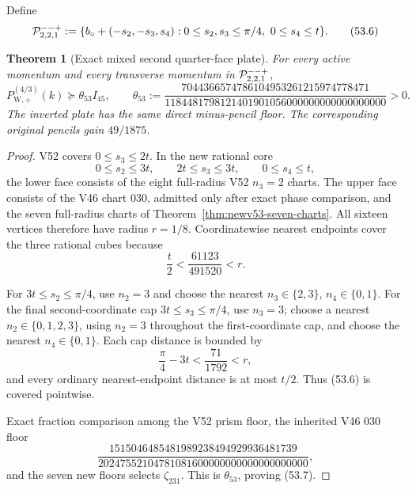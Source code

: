 \documentclass[11pt,oneside]{article}
\newtheorem{theorem}{Theorem}[section]
\theoremstyle{definition}
\theoremstyle{remark}
\begin{document}
Define
\[
 {\cal P}_{2,2,1}^{--+}:=
 \{b_\circ+(-s_2,-s_3,s_4):
 0\le s_2,s_3\le\pi/4,\ 0\le s_4\le t\}.             \tag{53.6}
\]

\begin{theorem}[Exact mixed second quarter-face plate]
\label{thm:newv53-mixed-plate}
For every active momentum and every transverse momentum in
\({\cal P}_{2,2,1}^{--+}\),
\[
 P_{\mathrm W,+}^{(4/3)}(k)
 \succeq\theta_{53}I_{45},\qquad
 \theta_{53}:=
 \frac{7044366574786104953261215974778471}
 {1184481798121401901056000000000000000000}>0.         \tag{53.7}
\]
The inverted plate has the same direct minus-pencil floor.  The
corresponding original pencils gain \(49/1875\).
\end{theorem}

\begin{proof}
V52 covers \(0\le s_3\le2t\).  In the new rational core
\[
 0\le s_2\le3t,\qquad2t\le s_3\le3t,\qquad
 0\le s_4\le t,                                      \tag{53.8}
\]
the lower face consists of the eight full-radius V52 \(n_3=2\)
charts.  The upper face consists of the V46 chart \(030\), admitted
only after exact phase comparison, and the seven full-radius charts
of Theorem~\ref{thm:newv53-seven-charts}.  All sixteen vertices
therefore have radius \(r=1/8\).  Coordinatewise nearest endpoints
cover the three rational cubes because
\[
 \frac t2<\frac{61123}{491520}<r.                    \tag{53.9}
\]

For \(3t\le s_2\le\pi/4\), use \(n_2=3\) and choose the nearest
\(n_3\in\{2,3\}\), \(n_4\in\{0,1\}\).  For the final
second-coordinate cap \(3t\le s_3\le\pi/4\), use \(n_3=3\);
choose a nearest \(n_2\in\{0,1,2,3\}\), using \(n_2=3\) throughout
the first-coordinate cap, and choose the nearest
\(n_4\in\{0,1\}\).  Each cap distance is bounded by
\[
 \frac{\pi}{4}-3t<\frac{71}{1792}<r,                 \tag{53.10}
\]
and every ordinary nearest-endpoint distance is at most \(t/2\).
Thus (53.6) is covered pointwise.

Exact fraction comparison among the V52 prism floor, the inherited
V46 \(030\) floor
\[
 \frac{1515046485481989238494929936481739}
 {20247552104781081600000000000000000000},
\]
and the seven new floors selects \(\zeta_{231}\).  This is
\(\theta_{53}\), proving (53.7).
\end{proof}
\end{document}

